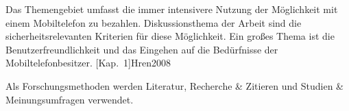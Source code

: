 
 Das Themengebiet umfasst die immer intensivere Nutzung der Möglichkeit mit einem Mobiltelefon
zu bezahlen. Diskussionsthema der Arbeit sind die sicherheitsrelevanten Kriterien für diese Möglichkeit. Ein großes Thema
ist die Benutzerfreundlichkeit und das Eingehen auf die Bedürfnisse der Mobiltelefonbesitzer. [Kap.~1]{Hren2008}


 Als Forschungsmethoden werden Literatur, Recherche & Zitieren und Studien & Meinungsumfragen
verwendet. 



